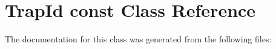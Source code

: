 \hypertarget{classTrapId_01const}{}\section{Trap\+Id const Class Reference}
\label{classTrapId_01const}


The documentation for this class was generated from the following files\+: